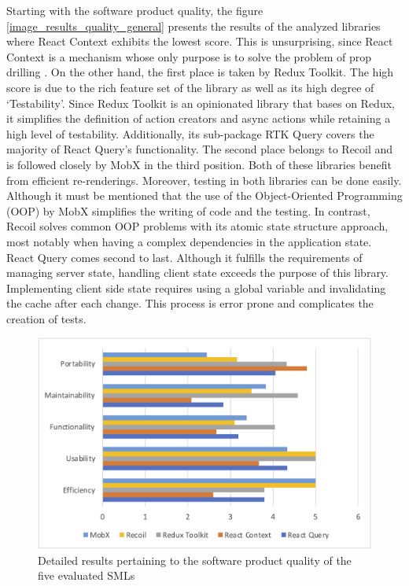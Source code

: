 Starting with the software product quality, the figure \ref{image_results_quality_general} presents the
results of the analyzed libraries where React Context exhibits the
lowest score. This is unsurprising, since React Context is a mechanism
whose only purpose is to solve the problem of prop drilling \cite{react_context}. On
the other hand, the first place is taken by Redux Toolkit. The high
score is due to the rich feature set of the library as well as its high
degree of `Testability'. Since Redux Toolkit is an opinionated library
that bases on Redux, it simplifies the definition of action
creators and async actions while retaining a high level of testability.
Additionally, its sub-package RTK Query covers the majority of React
Query's functionality. The second place belongs to Recoil and is
followed closely by MobX in the third position. Both of these libraries
benefit from efficient re-renderings. Moreover, testing
in both libraries can be done easily. Although it must be mentioned that
the use of the Object-Oriented Programming (OOP) by MobX simplifies the writing of code and the testing.
In contrast, Recoil solves common OOP problems with its atomic state
structure approach, most notably when having a complex dependencies in
the application state. React Query comes second to last. Although it
fulfills the requirements of managing server state, handling client
state exceeds the purpose of this library. Implementing client side
state requires using a global variable and invalidating the cache after
each change. This process is error prone and complicates the creation of
tests.

\begin{figure}
    \centering
    \includegraphics{images/chart_quality_details}
    \caption{Detailed results pertaining to the software product quality of the five evaluated SMLs}
    \label{image_results_quality_datailed}
\end{figure}

